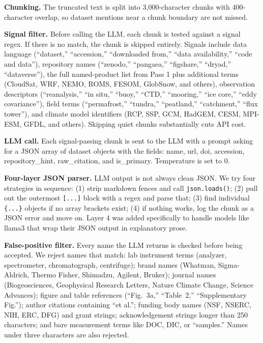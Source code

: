 \documentclass[sigconf]{acmart}
\begin{document}
\textbf{Chunking.}
The truncated text is split into 3,000-character chunks with 400-character overlap,
so dataset mentions near a chunk boundary are not missed.

\textbf{Signal filter.}
Before calling the LLM, each chunk is tested against a signal regex. If there is
no match, the chunk is skipped entirely. Signals include data language
(``dataset,'' ``accession,'' ``downloaded from,'' ``data availability,''
``code and data''), repository names (``zenodo,'' ``pangaea,'' ``figshare,''
``dryad,'' ``dataverse''), the full named-product list from Pass 1 plus additional
terms (CloudSat, WRF, NEMO, ROMS, FESOM, GlobSnow, and others), observation
descriptors (``reanalysis,'' ``in situ,'' ``buoy,'' ``CTD,'' ``mooring,''
``ice core,'' ``eddy covariance''), field terms (``permafrost,'' ``tundra,''
``peatland,'' ``catchment,'' ``flux tower''), and climate model identifiers (RCP,
SSP, GCM, HadGEM, CESM, MPI-ESM, GFDL, and others). Skipping quiet chunks
substantially cuts API cost.

\textbf{LLM call.}
Each signal-passing chunk is sent to the LLM with a prompt asking for a JSON array
of dataset objects with the fields: name, url, doi, accession, repository\_hint,
raw\_citation, and is\_primary. Temperature is set to 0.

\textbf{Four-layer JSON parser.}
LLM output is not always clean JSON. We try four strategies in sequence:
(1) strip markdown fences and call \texttt{json.loads()};
(2) pull out the outermost \texttt{[...]} block with a regex and parse that;
(3) find individual \texttt{\{...\}} objects if no array brackets exist;
(4) if nothing works, log the chunk as a JSON error and move on.
Layer 4 was added specifically to handle models like llama3 that wrap their JSON
output in explanatory prose.

\textbf{False-positive filter.}
Every name the LLM returns is checked before being accepted. We reject names that
match: lab instrument terms (analyzer, spectrometer, chromatograph, centrifuge);
brand names (Whatman, Sigma-Aldrich, Thermo Fisher, Shimadzu, Agilent, Bruker);
journal names (Biogeosciences, Geophysical Research Letters, Nature Climate Change,
Science Advances); figure and table references (``Fig.~3a,'' ``Table~2,''
``Supplementary Fig.''); author citations containing ``et al.''; funding body names
(NSF, NSERC, NIH, ERC, DFG) and grant strings; acknowledgement strings longer than
250 characters; and bare measurement terms like DOC, DIC, or ``samples.'' Names
under three characters are also rejected.
\end{document}
